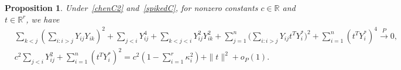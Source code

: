 \documentclass[3p]{elsarticle}
\DeclareMathOperator{\mytr}{tr}
\theoremstyle{plain}
\newtheorem{proposition}{\quad\quad Proposition}
\theoremstyle{definition}
\theoremstyle{remark}
\begin{document}
\begin{proposition}\label{proposition:jxz}
    Under~\eqref{chenC2} and~\eqref{spikedC},
    for nonzero constants $c\in\mathbb{R}$ and $t\in\mathbb{R}^r$,
    we have
    \begin{align}
    \label{lemma2R1}
        &\sum_{k<j}(\sum_{i:i>j}Y_{ij} Y_{ik})^2
        +\sum_{j<i}Y_{ij}^4
        +\sum_{k<j<i}Y_{ij}^2 Y_{ik}^2
        +\sum_{j=1}^n \big(\sum_{i:i>j} Y_{ij}t^T Y_i^*\big)^2
        +\sum_{i=1}^n (t^T Y_i^*)^4 \xrightarrow{P}0,
        \\
        &c^2 \sum_{j<i}Y_{ij}^2+\sum_{i=1}^n (t^T Y_i^*)^2=c^2(1-\sum_{i=1}^r \kappa_i^2)+\|t\|^2+o_P(1).\label{lemma2Rn}
    \end{align}
\end{proposition}
\end{document}
